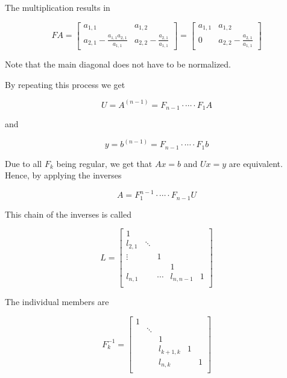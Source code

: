 The multiplication results in

\[
    FA = 
    \begin{bmatrix}
        a_{1,1} & a_{1,2} \\ 
        a_{2,1}  - \frac{a_{1,1}a_{2,1}}{a_{1,1}} & a_{2,2} - \frac{a_{2,1}}{a_{1,1}}
    \end{bmatrix}
    = 
    \begin{bmatrix}
        a_{1,1} & a_{1,2} \\ 
        0 & a_{2,2} - \frac{a_{2,1}}{a_{1,1}}
    \end{bmatrix}
\]

Note that the main diagonal does not have to be normalized.

By repeating this process we get 

\[
    U = A^{(n - 1)} = F_{n - 1} \cdot \cdots \cdot F_1 A
\]

and 

\[
    y = b^{(n - 1)} = F_{n - 1} \cdot \cdots \cdot F_1 b
\]

Due to all \(F_k\) being regular, we get that \(Ax = b\) and \(Ux = y\) are equivalent.
Hence, by applying the inverses 

\[
    A = F_{1}^{n - 1} \cdot \cdots \cdot F_{n - 1} U
\]

This chain of the inverses is called 

\[
    L = 
    \begin{bmatrix}
        1 &        &         &   &        \\
        l_{2,1}  & \ddots &         &   &        \\
        \vdots &        & 1       &   &        \\
          &        &  & 1 &        \\
        l_{n,1} &        &  \cdots      &  l_{n,n-1} & 1 \\
    \end{bmatrix}
\]

The individual members are 

\[
    F_{k}^{-1} = 
    \begin{bmatrix}
        1 &        &         &   &        \\
          & \ddots &         &   &        \\
          &        & 1       &   &        \\
          &        & l_{k+1,k} & 1 &        \\
          &        & l_{n,k}      &   & 1 \\
    \end{bmatrix}
\]

